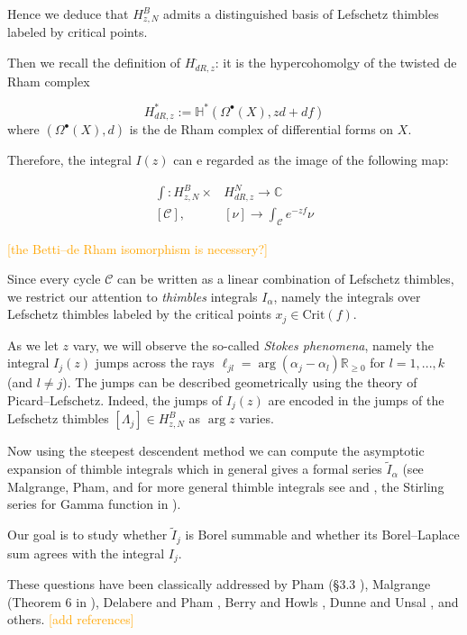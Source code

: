 \documentclass{article}
\theoremstyle{definition}
\newcommand{\R}{\mathbb{R}}
\newcommand{\C}{\mathbb{C}}
\begin{document}
Hence we deduce that $H_{z, N}^B$ admits a distinguished basis of Lefschetz thimbles labeled by critical points.


Then we recall the definition of $H_{dR,z}^\cdot$: it is the hypercohomolgy of the twisted de Rham complex 

\begin{equation*}
    H_{dR,z}^*:=\mathbb{H}^*( \Omega^\bullet(X), zd+df)
\end{equation*}
where $(\Omega^\bullet(X), d)$ is the de Rham complex of differential forms on $X$. 

Therefore, the integral $I(z)$ can e regarded as the image of the following map: 

\begin{align*}
    \int \colon  H_{z,N}^{B} \times & H_{dR,z}^N \to \C \\
       [\mathcal{C}] ,\,\, & [\nu] \to \int_{\mathcal{C}}e^{-zf}\nu
\end{align*}

\textcolor{orange}{[the Betti--de Rham isomorphism is necessery?]}

Since every cycle $\mathcal{C}$ can be written as a linear combination of Lefschetz thimbles, we restrict our attention to  \textit{thimbles} integrals $I_\alpha$, namely the integrals over Lefschetz thimbles labeled by the critical points $x_j\in\text{Crit}(f)$.

As we let $z$ vary, we will observe the so-called \textit{Stokes phenomena}, namely the integral $I_j(z)$ jumps across the rays $\ell_{jl}=\arg(\alpha_j-\alpha_l)\R_{\geq 0}$ for $l=1,...,k$ (and $l\neq j$). The jumps can be described geometrically using the theory of Picard--Lefschetz. Indeed, the jumps of $I_j(z)$ are encoded in the jumps of the Lefschetz thimbles $[\Lambda_j]\in H_{z,N}^B$ as $\arg z$ varies.   


Now using the steepest descendent method we can compute the asymptotic expansion of thimble integrals which in general gives a formal series $\tilde{I}_\alpha$ (see Malgrange, Pham, and for more general thimble integrals see \cite[Section 1.2.2]{mistegard_phdthesis} and \cite{andersen2020resurgence}, the Stirling series for Gamma function in \cite{Maxim_slide_ERC,Maxim_talk_2023}).

Our goal is to study whether $\tilde{I}_j$ is Borel summable and whether its Borel--Laplace sum agrees with the integral $I_j$. 

These questions have been classically addressed by Pham (\S 3.3 \cite{pham}), Malgrange (Theorem 6 in \cite{Malgrange22}), Delabere and Pham \cite{Delabaere-Pham99}, Berry and Howls \cite{berry1991hyperasymptotics}, Dunne and Unsal \cite{dunne-unsal}, and others. \textcolor{orange}{[add references]} 
\end{document}
